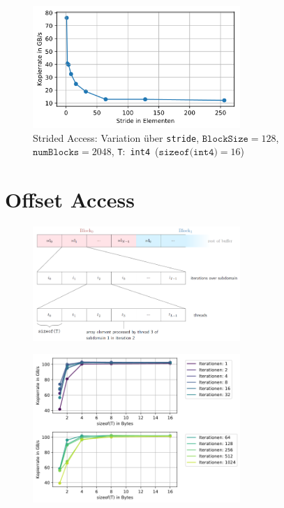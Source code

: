\documentclass[11pt, abstract=on]{scrartcl}
\begin{document}
\begin{figure} [htbp]
 	\centering
 		\includegraphics[width=0.7\textwidth]{Graph_StridedAccess2.png}
 	 	\caption{Strided Access: Variation über \texttt{stride}, $\texttt{BlockSize} = 128$, $\texttt{numBlocks} = 2048$, \texttt{T}:~\texttt{int4}~($\texttt{sizeof(int4)} = 16$)}
 	\label{fig:StridedAccess2}
\end{figure}

\section{Offset Access}

\begin{figure} [htbp]
 	\centering
 		\includegraphics[width=0.7\textwidth]{Graph_OffsetAccessZugriff.png}
 	\caption{}
\end{figure}

\begin{figure} [htbp]
 	\centering
 		\includegraphics[width=0.7\textwidth]{Graph_OffsetAccess1.png}
 	\caption{}
\end{figure}
\end{document}
